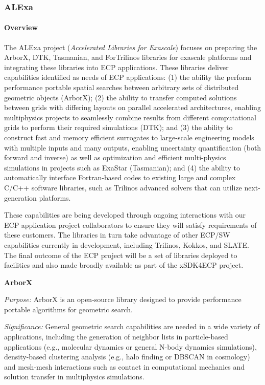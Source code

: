 \subsubsection{ ALExa}


\paragraph{Overview}

The ALExa project ({\sl Accelerated Libraries for Exascale}) focuses on
preparing the ArborX, DTK, Tasmanian, and ForTrilinos libraries for exascale
platforms and integrating these libraries into ECP applications.
These libraries deliver capabilities identified as needs of ECP applications:
%
(1) the ability the perform performance portable spatial searches between
arbitrary sets of distributed geometric objects (ArborX);
%
(2) the ability to transfer computed
solutions between grids with differing layouts on parallel accelerated
architectures, enabling multiphysics projects to seamlessly combine results
from different computational grids to perform their required simulations
(DTK); and
%
(3) the ability to construct fast and memory efficient surrogates to
large-scale engineering models with multiple inputs and many outputs,
enabling uncertainty quantification (both forward and inverse) as well as
optimization and efficient multi-physics simulations in projects such as
ExaStar (Tasmanian); and
%
(4) the ability to automatically interface Fortran-based codes to existing
large and complex C/C++ software libraries, such as Trilinos advanced solvers
that can utilize next-generation platforms.


These capabilities are being developed through ongoing interactions with our
ECP application project collaborators to ensure they will satisfy requirements
of these customers.  The libraries in turn take advantage of other ECP/SW
capabilities currently in development, including Trilinos,
Kokkos, and SLATE.  The final outcome of the ECP project will be a set of
libraries deployed to facilities and also made broadly available as part of
the xSDK4ECP project.


{\bf ArborX}

{\it Purpose:} ArborX is an open-source library designed to provide
performance portable algorithms for geometric search.

{\it Significance:} General geometric search capabilities are needed in a wide
variety of applications, including the generation of neighbor lists in
particle-based applications (e.g., molecular dynamics or general N-body
dynamics simulations), density-based clustering analysis (e.g., halo finding
or DBSCAN in cosmology) and mesh-mesh interactions such as contact in
computational mechanics and solution transfer in multiphysics simulations.

